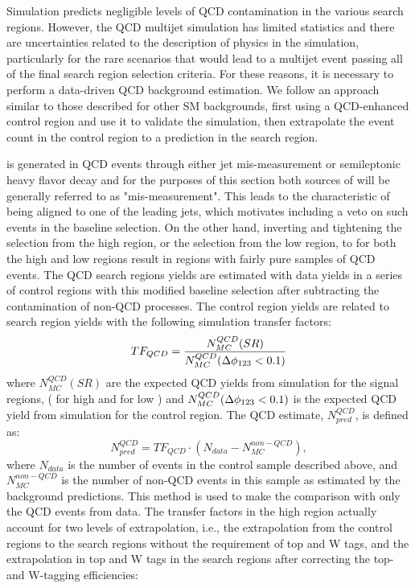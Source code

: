 Simulation predicts negligible levels of QCD contamination in the various search regions. However, the QCD multijet simulation has limited statistics and there are uncertainties related to the description of physics in the simulation, particularly for the rare scenarios that would lead to a multijet event passing all of the final search region selection criteria. For these reasons, it is necessary to perform a data-driven QCD background estimation. We follow an approach similar to those described for other SM backgrounds, first using a QCD-enhanced control region and use it to validate the simulation, then extrapolate the event count in the control region to a prediction in the search region. 

\met{} is generated in QCD events through either jet \pt{} mis-measurement or semileptonic heavy flavor decay and for the purposes of this section both sources of \met{} will be generally referred to as "mis-measurement". This leads to the characteristic of \met{} being aligned to one of the leading jets, which motivates including a veto on such events in the baseline selection. On the other hand, inverting and tightening the \highdm{} selection from the high \dm{} region, or the \lowdm{} selection from the low \dm{} region, to \qcdcr{} for both the high and low \dm{} regions result in regions with fairly pure samples of QCD events. The QCD search regions yields are estimated with data yields in a series of control regions with this modified baseline selection after subtracting the contamination of non-QCD processes. The control region yields are related to search region yields with the following simulation transfer factors:
\begin{equation}\label{QCDTF}
TF_{QCD}=\frac{N_{MC}^{QCD}(SR)}{N_{MC}^{QCD}(\Delta\phi_{123}<0.1)}
\end{equation}
where $N_{MC}^{QCD}(SR)$ are the expected QCD yields from simulation for the signal regions, (\highdm{} for high \dm{} and \lowdm{} for low \dm) and $N_{MC}^{QCD}(\Delta\phi_{123}<0.1)$ is the expected QCD yield from simulation for the control region. The QCD estimate, $N_{pred}^{QCD}$, is defined as:
\begin{equation}
N_{pred}^{QCD}=TF_{QCD}\cdot(N_{data}-N_{MC}^{non-QCD}),
\end{equation}
where $N_{data}$ is the number of events in the \qcdcr{} control sample described above, and $N_{MC}^{non-QCD}$ is the number of non-QCD events in this sample as estimated by the background predictions. This method is used to make the comparison with only the QCD events from data. The transfer factors in the high \dm{} region actually account for two levels of extrapolation, i.e., the extrapolation from the control regions to the search regions without the requirement of top and W tags, and the extrapolation in top and W tags in the search regions after correcting the top- and W-tagging efficiencies:
